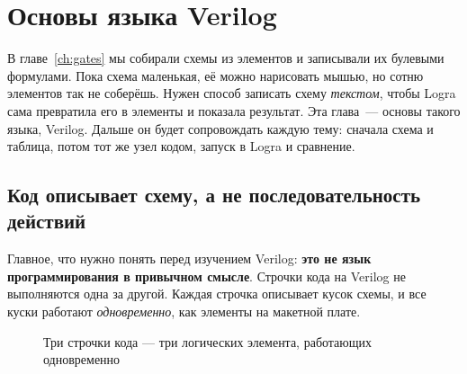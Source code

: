 \chapter{Основы языка Verilog}
\label{ch:verilog}

В главе~\ref{ch:gates} мы собирали схемы из элементов и записывали их булевыми
формулами. Пока схема маленькая, её можно нарисовать мышью, но сотню элементов
так не соберёшь. Нужен способ записать схему \emph{текстом}, чтобы Logra сама
превратила его в элементы и показала результат. Эта глава~--- основы такого
языка, Verilog. Дальше он будет сопровождать каждую тему: сначала схема и
таблица, потом тот же узел кодом, запуск в Logra и сравнение.

\section{Код описывает схему, а не последовательность действий}

Главное, что нужно понять перед изучением Verilog: \textbf{это не язык
программирования в привычном смысле}. Строчки кода на Verilog не выполняются
одна за другой. Каждая строчка описывает кусок схемы, и все куски
работают \emph{одновременно}, как элементы на макетной плате.

\begin{figure}[H]
\centering
{}
\caption{Три строчки кода --- три логических элемента, работающих одновременно}
\label{fig:code_to_schem}
\end{figure}

